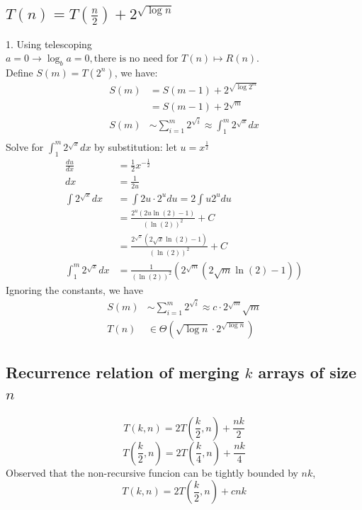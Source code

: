 \documentclass[9pt]{extarticle}
\begin{document}
\subsection*{$T(n) = T(\frac{n}{2}) + 2^{\sqrt{\log n}}$}
1. Using telescoping\\
$a = 0 \rightarrow \log_b a = 0, \text{there is no need for }T(n) \mapsto R(n).$\\
Define $S(m) = T(2^n)$, we have:\\
\begin{align*}
    S(m) &= S(m - 1) + 2^{\sqrt{\log{2^m}}}\\
    &= S(m - 1) + 2^{\sqrt{m}}    \\
    S(m) &\sim \sum_{i=1}^{m} 2^{\sqrt{i}} \approx \int_{1}^{m} 2^{\sqrt{x}} dx\\
\end{align*}
Solve for $ \int_{1}^{m} 2^{\sqrt{x}} dx$ by substitution: let $u = x^\frac{1}{2}$
\begin{align*}
    \frac{du}{dx} &= \frac{1}{2}x^{-\frac{1}{2}}\\
    dx &= \frac{1}{2u}\\
    \int 2^{\sqrt{x}} dx &= \int 2u\cdot 2^u du = 2\int u2^udu\\
    &= \frac{2^u(2u \ln(2) - 1)}{(\ln(2))^2} + C\\
    &= \frac{2^{\sqrt{x}}(2\sqrt{x} \ln(2) - 1)}{(\ln(2))^2} + C\\
    \int_{1}^{m} 2^{\sqrt{x}} dx &= \frac{1}{(\ln(2))^2}\left(2^{\sqrt{m}}(2\sqrt{m} \ln(2)-1)\right)
\end{align*}
Ignoring the constants, we have 
\begin{align*}
    S(m) &\sim \sum_{i=1}^{m} 2^{\sqrt{i}} \approx c\cdot 2^{\sqrt{m}}\sqrt{m}\\
    T(n) &\in \Theta(\sqrt{\log n}\cdot 2^{\sqrt{\log n}})
\end{align*}
\subsection*{Recurrence relation of merging $k$ arrays of size $n$}
\[T(k, n) = 2T(\frac{k}{2}, n) + \frac{nk}{2}\]
\[T(\frac{k}{2}, n) = 2T(\frac{k}{4}, n) + \frac{nk}{4}\]
Observed that the non-recursive funcion can be tightly bounded by $nk$,
\[T(k, n) = 2T(\frac{k}{2}, n) + cnk\]
\end{document}
